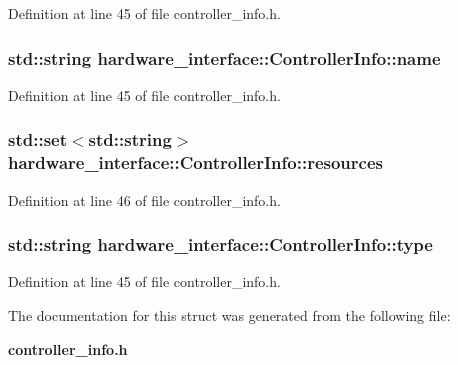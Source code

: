\-Definition at line 45 of file controller\-\_\-info.\-h.

\subsubsection[{name}]{\setlength{\rightskip}{0pt plus 5cm}std\-::string {\bf hardware\-\_\-interface\-::\-Controller\-Info\-::name}}\label{structhardware__interface_1_1ControllerInfo_a8c6d7a1ca9302d58f55ae2ea1b365635}


\-Definition at line 45 of file controller\-\_\-info.\-h.

\subsubsection[{resources}]{\setlength{\rightskip}{0pt plus 5cm}std\-::set$<$std\-::string$>$ {\bf hardware\-\_\-interface\-::\-Controller\-Info\-::resources}}\label{structhardware__interface_1_1ControllerInfo_a9ca5b9a98e0c71d60869e8da4dcd77b4}


\-Definition at line 46 of file controller\-\_\-info.\-h.

\subsubsection[{type}]{\setlength{\rightskip}{0pt plus 5cm}std\-::string {\bf hardware\-\_\-interface\-::\-Controller\-Info\-::type}}\label{structhardware__interface_1_1ControllerInfo_a4ef630c5bfd994650861829629b11ab2}


\-Definition at line 45 of file controller\-\_\-info.\-h.



\-The documentation for this struct was generated from the following file\-:\begin{DoxyCompactItemize}
\item 
{\bf controller\-\_\-info.\-h}\end{DoxyCompactItemize}
